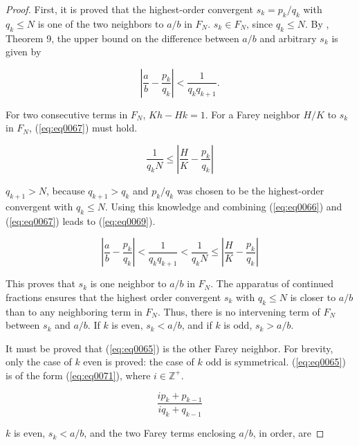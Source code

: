 \documentclass{esub2acm}
\newcommand{\intsetnonneg}{{\mathbb{Z}^+}}
\begin{document}
\begin{proof}
First, it is proved that the highest-order
convergent $s_k = p_k/q_k$ with $q_k \leq N$ is one of the two
neighbors to $a/b$ in $F_N$.  $s_k \in F_N$, since $q_k \leq N$.
By \cite{KhinchinClassic}, Theorem 9, the upper bound on the
difference between $a/b$ and arbitrary $s_k$ is given by

\begin{equation}
\label{eq:eq0066}
\left| {\frac{a}{b}  - \frac{{p_k }}{{q_k }}} \right| < \frac{1}{{q_k q_{k + 1} }}.
\end{equation}

For two consecutive terms in $F_N$, $Kh-Hk=1$.
For a Farey neighbor $H/K$ to $s_k$ in $F_N$, (\ref{eq:eq0067}) must hold.

\begin{equation}
\label{eq:eq0067}
\frac{1}{q_k N} \leq \left| {\frac{H}{K} - \frac{p_k}{q_k}} \right|
\end{equation}

$q_{k+1}>N$, because $q_{k+1}>q_k$ and $p_k/q_k$ was chosen to be the
highest-order convergent with $q_k\leq N$.  Using this knowledge and
combining (\ref{eq:eq0066}) and (\ref{eq:eq0067}) leads to
(\ref{eq:eq0069}).

\begin{equation}
\label{eq:eq0069}
\left| {\frac{a}{b}  - \frac{{p_k }}{{q_k }}} \right| < \frac{1}{{q_k q_{k + 1} }}
<
\frac{1}{q_k N} \leq \left| {\frac{H}{K} - \frac{p_k}{q_k}} \right|
\end{equation}

This proves that $s_k$ is one neighbor to $a/b$ in $F_N$.
The apparatus of continued fractions ensures that the
highest order convergent $s_k$ with $q_k\leq N$ is closer to $a/b$ than
to any neighboring term in $F_N$.  Thus, there is
no intervening term of $F_N$ between $s_k$ and $a/b$.
If $k$ is even, $s_k<a/b$, and if $k$ is
odd, $s_k>a/b$.

It must be proved that (\ref{eq:eq0065}) is the other Farey
neighbor.  For brevity, only the case of $k$ even is proved:  the
case of $k$ odd is symmetrical.  (\ref{eq:eq0065}) is of the form (\ref{eq:eq0071}),
where $i \in \intsetnonneg$.

\begin{equation}
\label{eq:eq0071}
\frac{{ip_k  + p_{k - 1} }}{{iq_k  + q_{k - 1} }}
\end{equation}

$k$ is even, $s_k < a/b$, and the two Farey terms enclosing $a/b$, in
order, are


\end{proof}
\end{document}
